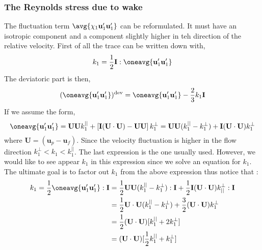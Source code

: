 \subsubsection{The Reynolds stress due to wake}
The fluctuation term $\avg{\chi_1 \textbf{u}_1'\textbf{u}_1'}$ can be reformulated. 
It must have an isotropic component and a component slightly higher in teh direction of the relative velocity.  
First of all the trace can be written down with, 
\begin{equation*}
    k_1=
    \frac{1}{2}\textbf{I}:\oneavg{\textbf{u}_1'\textbf{u}_1'}
\end{equation*}
The deviatoric part is then, 
\begin{equation*}
    (\oneavg{\textbf{u}_1'\textbf{u}_1'})^\text{dev}=
    \oneavg{\textbf{u}_1'\textbf{u}_1'}
    - \frac{2}{3}k_1\textbf{I}
\end{equation*}
If we assume the form, 
\begin{equation*}
    \oneavg{\textbf{u}_1'\textbf{u}_1'}
    = 
    \textbf{U}
    \textbf{U}
    k^{||}_1
    + 
    \left[
        \textbf{I} (\textbf{U}\cdot \textbf{U})
    -
    \textbf{U}
    \textbf{U}
    \right]
    k^{\bot}_1
    = 
    \textbf{U}
    \textbf{U}
    (k^{||}_1 - k^{\bot}_1)
    + \textbf{I} (\textbf{U}\cdot\textbf{U}) k^\bot_1
\end{equation*}
where $\textbf{U} = (\textbf{u}_p - \textbf{u}_f)$. 
Since the velocity fluctuation is higher in the flow direction $k^\bot_1 < k_1 < k^{||}_1$. 
The last expression is the one usually used. 
However, we would like to see appear $k_1$ in this expression since we solve an equation for $k_1$.  
The ultimate goal is to factor out $k_1$ from the above expression thus notice that :
\begin{align*}
    k_1 =
    \frac{1}{2} \oneavg{\textbf{u}_1'\textbf{u}_1'} : \textbf{I}
    &= 
    \frac{1}{2} \textbf{U}
    \textbf{U}
    (k^{||}_1 - k^{\bot}_1) : \textbf{I}
    + \frac{1}{2} \textbf{I} (\textbf{U}\cdot\textbf{U}) k^\bot_{||} : \textbf{I}\\
    &= 
    \frac{1}{2} 
    \textbf{U}\cdot 
    \textbf{U}
    (k^{||}_1 - k^{\bot}_1)
    + \frac{3}{2}  (\textbf{U}\cdot\textbf{U}) k^\bot_1 \\
    &= 
    \frac{1}{2} 
    (\textbf{U}\cdot 
    \textbf{U})[
        k^{||}_1 
        + 2 k^\bot_1
    ]\\
    &= 
    (\textbf{U}\cdot 
    \textbf{U})[
        \frac{1}{2}k^{||}_1 
        + k^\bot_1
    ]
\end{align*}
